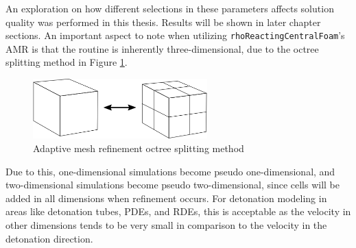 An exploration on how different selections in these parameters affects solution quality was performed in this thesis. Results will be shown in later chapter sections. An important aspect to note when utilizing \verb|rhoReactingCentralFoam|'s AMR is that the routine is inherently three-dimensional, due to the octree splitting method in Figure \ref{fig:octree}. 
\begin{figure}[t!]
\centering
\includegraphics[width=0.6\textwidth]{./figs/amr_example.png}
\caption{Adaptive mesh refinement octree splitting method}
\label{fig:octree}
\end{figure}%
\noindent Due to this, one-dimensional simulations become pseudo one-dimensional, and two-dimensional simulations become pseudo two-dimensional, since cells will be added in all dimensions when refinement occurs. For detonation modeling in areas like detonation tubes, PDEs, and RDEs, this is acceptable as the velocity in other dimensions tends to be very small in comparison to the velocity in the detonation direction. 


